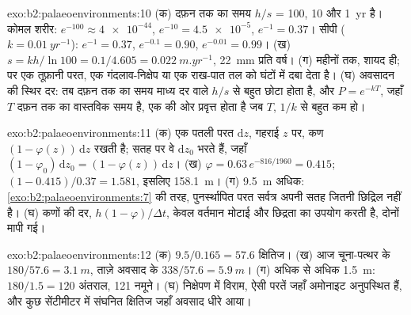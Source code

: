 \begin{solution}{exo:b2:palaeoenvironments:10}
(क) दफ़न तक का समय $h/s$ = 100, 10 और \qty{1}{yr} है। कोमल शरीर: $e^{-100} \approx
\num{4e-44}$, $e^{-10} = \num{4.5e-5}$, $e^{-1} = 0.37$। सीपी ($k = \qty{0.01}{yr^{-1}}$):
$e^{-1} = 0.37$, $e^{-0.1} = 0.90$, $e^{-0.01} = 0.99$। (ख) $s = kh/\ln 100 = 0.1/4.605 =
\qty{0.022}{m.yr^{-1}}$, \qty{22}{mm} प्रति वर्ष। (ग) महीनों तक, शायद ही; पर एक तूफ़ानी परत, एक
गंदलाव-निक्षेप या एक राख-पात तल को घंटों में दबा देता है। (घ) अवसादन की स्थिर दर: तब
दफ़न तक का समय माध्य दर वाले $h/s$ से बहुत छोटा होता है, और $P = e^{-kT}$, जहाँ $T$
दफ़न तक का वास्तविक समय है, एक की ओर प्रवृत्त होता है जब $T$, $1/k$ से बहुत कम हो।
\end{solution}

\begin{solution}{exo:b2:palaeoenvironments:11}
(क) एक पतली परत $\mathrm dz$, गहराई $z$ पर, कण $(1 - \varphi(z))\,\mathrm dz$ रखती है;
सतह पर वे $\mathrm dz_0$ भरते हैं, जहाँ $(1 - \varphi_0)\,\mathrm dz_0 = (1 -
\varphi(z))\,\mathrm dz$। (ख) $\varphi = 0.63\,e^{-816/1960} = 0.415$; $(1 - 0.415)/0.37 =
1.581$, इसलिए \qty{158.1}{m}। (ग) \qty{9.5}{m} अधिक: \cref{exo:b2:palaeoenvironments:7} की तरह,
पुनर्स्थापित परत सर्वत्र अपनी सतह जितनी छिद्रिल नहीं है। (घ) कणों की दर,
$h(1-\varphi)/\Delta t$, केवल वर्तमान मोटाई और छिद्रता का उपयोग करती है, दोनों मापी गई।
\end{solution}

\begin{solution}{exo:b2:palaeoenvironments:12}
(क) $9.5/0.165 = 57.6$ क्षितिज। (ख) आज चूना-पत्थर के $180/57.6 = \qty{3.1}{m}$, ताज़े अवसाद के $338/57.6 =
\qty{5.9}{m}$। (ग) अधिक से अधिक \qty{1.5}{m}: $180/1.5 = 120$ अंतराल, 121
नमूने। (घ) निक्षेपण में विराम, ऐसी परतें जहाँ अमोनाइट अनुपस्थित हैं, और कुछ सेंटीमीटर में संघनित
क्षितिज जहाँ अवसाद धीरे आया।
\end{solution}

